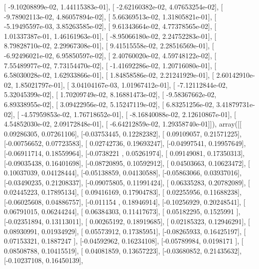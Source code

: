 \documentclass{article}
\begin{document}
       [ -9.10208899e-02,   1.44115383e-01],
       [ -2.62160382e-02,   4.07653254e-02],
       [ -9.78902113e-02,   4.86057894e-02],
       [  5.66369513e-02,   1.31805821e-01],
       [ -5.19495597e-03,   3.85263585e-02],
       [  9.61343664e-02,   4.77378565e-02],
       [  1.01337387e-01,   1.46161963e-01],
       [ -8.95066180e-02,   2.24752283e-01],
       [  8.79828710e-02,   2.29967308e-01],
       [  9.41515558e-02,   2.28516569e-01],
       [ -6.92496021e-02,   6.95850597e-02],
       [  2.40760020e-02,   4.59748122e-02],
       [  7.55489977e-02,   7.73154470e-02],
       [ -1.41692286e-02,   1.20716080e-01],
       [  6.58030028e-02,   1.62933866e-01],
       [  1.84858586e-02,   2.21241929e-01],
       [  2.60142910e-02,   1.85021797e-01],
       [  3.04104167e-03,   1.01967412e-01],
       [ -7.12112844e-02,   5.32045399e-02],
       [  1.70209749e-02,   8.16881473e-02],
       [ -9.58367662e-02,   6.89338955e-02],
       [  3.09422956e-02,   5.15247119e-02],
       [  6.83251256e-02,   3.41879731e-02],
       [ -4.57959853e-02,   1.76718652e-01],
       [ -8.16840088e-02,   2.12610867e-01],
       [  4.54852030e-02,   2.09172848e-01],
       [ -6.64212859e-02,   1.29358740e-01]]), array([[ 0.09286305,  0.07261106],
       [-0.03753445,  0.12282382],
       [ 0.09109057,  0.21571225],
       [-0.00756652,  0.07723583],
       [ 0.02742736,  0.19693247],
       [-0.04997541,  0.19957649],
       [-0.06911714,  0.18559964],
       [-0.0738221 ,  0.05261974],
       [ 0.09149081,  0.17350313],
       [-0.09035438,  0.16401698],
       [-0.08720895,  0.10592912],
       [ 0.04503663,  0.10623472],
       [ 0.10037039,  0.04128444],
       [-0.05138859,  0.04130588],
       [-0.05863066,  0.03937016],
       [-0.03490235,  0.21208337],
       [-0.09075805,  0.11991424],
       [ 0.06335283,  0.20782089],
       [ 0.02445223,  0.17895134],
       [ 0.09416169,  0.17904783],
       [ 0.02255956,  0.11688238],
       [-0.06025608,  0.04886757],
       [-0.011154  ,  0.18946914],
       [-0.10256929,  0.20248541],
       [ 0.06791015,  0.06244244],
       [ 0.06384303,  0.11417673],
       [ 0.05182295,  0.1525991 ],
       [-0.02351894,  0.13113011],
       [ 0.00265192,  0.18919685],
       [ 0.02185323,  0.12946291],
       [ 0.08930991,  0.01934929],
       [ 0.05573912,  0.17385951],
       [-0.08265933,  0.16425197],
       [ 0.07153321,  0.1887247 ],
       [-0.04592962,  0.16234108],
       [-0.05789984,  0.0198171 ],
       [ 0.08508788,  0.10415519],
       [ 0.04081859,  0.13657223],
       [-0.03680852,  0.21435632],
       [-0.10237108,  0.16450139],
\end{document}
